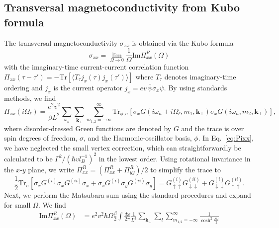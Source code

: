 \documentclass[aps,prb,10pt,amsmath,amssymb,twocolumn,floatfix,superscriptaddress,showpacs,numerical,footinbib]{revtex4-1}
\begin{document}
\begin{widetext}
\subsection{Transversal magnetoconductivity from Kubo formula}

The transversal magnetoconductivity $\sigma_{xx}$ is obtained via the Kubo formula
%
\begin{equation}
 \sigma_{xx} = \lim\limits_{\Omega \to 0} \frac{1}{\Omega} \mathrm{Im} \Pi^R_{xx} (\Omega)
\end{equation}
with the imaginary-time current-current correlation function $\Pi_{xx} (\tau - \tau') = - \mathrm{Tr} \left[ \langle T_\tau j_x (\tau) j_x (\tau') \rangle \right]$ where $T_\tau$ denotes imaginary-time ordering and $j_x$ is the current operator $j_x = e v \,\bar{\psi} \sigma_x \psi$.
%
By using standards methods,\cite{BruusBook} we find
%
\begin{equation}
\Pi_{xx} \left( i \Omega_\ell \right) = \frac{e^{2}v^{2}}{\beta L^2} \sum_{\omega_{n}} \sum_{\mathbf{k}_\perp} \sum_{m_{1,2}=-\infty}^{\infty} \mathrm{Tr}_{\phi,\sigma} \left [\sigma_{x} G \left( i \omega_{n}+i\Omega_\ell , m_1, \mathbf{k}_\perp \right)\sigma_{x} G \left( i\omega_{n} , m_2 , \mathbf{k}_\perp \right) \right],
\label{eq:Pixx}
\end{equation}
%
where disorder-dressed Green functions are denoted by $G$ and the trace is over spin degrees of freedom, $\sigma$, and the Harmonic-oscillator basis, $\phi$.
%
In Eq.~\eqref{eq:Pixx}, we have neglected the small vertex correction, which can straightforwardly be calculated to be $\Gamma^2/(\hbar v l_B^{-1})^2$ in the lowest order.
%
Using rotational invariance in the $x$-$y$ plane, we write $\Pi_{xx}^R = ( \Pi_{xx}^R + \Pi_{yy}^R ) /2$ to simplify the trace to
%
\begin{equation}
 \frac{1}{2} \mathrm{Tr}_\sigma \left[ \sigma_x G^{(i)} \sigma_x G^{(ii)} \sigma_x + \sigma_x G^{(i)} \sigma_y G^{(ii)} \sigma_y \right] = G^{(i)}_{\uparrow\uparrow} G^{(ii)}_{\downarrow\downarrow} + G^{(i)}_{\downarrow\downarrow} G^{(ii)}_{\uparrow\uparrow}.
\end{equation}
%
Next, we perform the Matsubara sum using the standard procedures and expand for small $\Omega$. We find
%
\begin{align}
\mathrm{Im}\Pi_{xx}^{R}\left(\Omega\right) & = e^{2}v^{2}\hbar\Omega \frac{\beta}{2}\int\frac{d \omega}{2\pi} \frac{1}{L^3} \sum_{\mathbf{k}_\perp} \sum_{l}\sum_{m_{1,2}=-\infty}^{\infty} \frac{1}{\cosh^{2}\frac{\beta \omega}{2}} \nonumber \\

\end{align}
\end{widetext}
\end{document}
